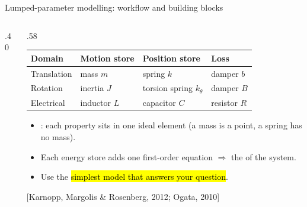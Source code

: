 \documentclass[aspectratio=169,10pt]{beamer}
\begin{document}
\begin{frame}{Lumped-parameter modelling: workflow and building blocks}
\begin{columns}[T]
\begin{column}{.40\textwidth}
\centering
{}
\end{column}
\begin{column}{.58\textwidth}
\small
\renewcommand{\arraystretch}{1.15}
\begin{tabular}{@{}llll@{}}
\toprule
\textbf{Domain} & \textbf{Motion store} & \textbf{Position store} & \textbf{Loss}\\
\midrule
Translation & mass $m$ & spring $k$ & damper $b$\\
Rotation & inertia $J$ & torsion spring $k_\theta$ & damper $B$\\
Electrical & inductor $L$ & capacitor $C$ & resistor $R$\\
\bottomrule
\end{tabular}

\vspace{2mm}
\begin{itemize}\setlength\itemsep{2pt}
\item {}: each property sits in one ideal element (a mass is a point, a spring has no mass).
\item Each energy store adds one first-order equation $\Rightarrow$ the  of the system.
\item Use the \hl{simplest model that answers your question}.
\end{itemize}
{\scriptsize\color{mkGray}[Karnopp, Margolis \& Rosenberg, 2012; Ogata, 2010]}
\end{column}
\end{columns}
\end{frame}
\end{document}
